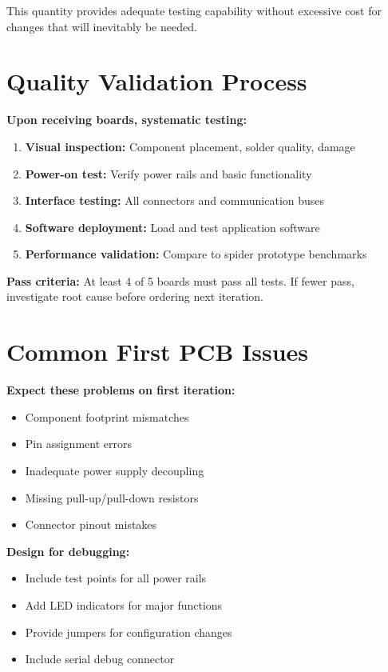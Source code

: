 This quantity provides adequate testing capability without excessive cost for changes that will inevitably be needed.

\section{Quality Validation Process}

\textbf{Upon receiving boards, systematic testing:}

\begin{enumerate}
\item \textbf{Visual inspection:} Component placement, solder quality, damage
\item \textbf{Power-on test:} Verify power rails and basic functionality
\item \textbf{Interface testing:} All connectors and communication buses
\item \textbf{Software deployment:} Load and test application software
\item \textbf{Performance validation:} Compare to spider prototype benchmarks
\end{enumerate}

\textbf{Pass criteria:} At least 4 of 5 boards must pass all tests. If fewer pass, investigate root cause before ordering next iteration.

\section{Common First PCB Issues}

\textbf{Expect these problems on first iteration:}
\begin{itemize}
\item Component footprint mismatches
\item Pin assignment errors
\item Inadequate power supply decoupling
\item Missing pull-up/pull-down resistors
\item Connector pinout mistakes
\end{itemize}

\textbf{Design for debugging:}
\begin{itemize}
\item Include test points for all power rails
\item Add LED indicators for major functions
\item Provide jumpers for configuration changes
\item Include serial debug connector
\end{itemize}

